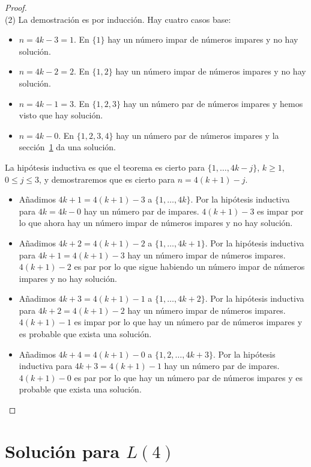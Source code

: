 \begin{proof}
\mbox{}\\
(2)
La demostración es por inducción.
Hay cuatro casos base:
\begin{itemize}
\item $n=4k-3=1$. En $\{1\}$ hay un número impar de números impares y no hay solución.
\item $n=4k-2=2$. En $\{1,2\}$ hay un número impar de números impares y no hay solución.
\item $n=4k-1=3$. En $\{1,2,3\}$ hay un número par de números impares y hemos visto que hay solución.
\item $n=4k-0$. En $\{1,2,3,4\}$ hay un número par de números impares y la sección~\ref{s.langford-four} da una solución.
\end{itemize}

La hipótesis inductiva es que el teorema es cierto para $\{1,\ldots,4k-j\}$, $k\ge 1$, $0\leq j\leq 3$, y demostraremos que es cierto para $n=4(k+1)-j$.

\begin{itemize}
\item Añadimos $4k+1=4(k+1)-3$ a $\{1,\ldots,4k\}$. Por la hipótesis inductiva para $4k=4k-0$ hay un número par de impares. $4(k+1)-3$ es impar por lo que ahora hay un número impar de números impares y no hay solución.
\item Añadimos $4k+2=4(k+1)-2$ a $\{1,\ldots,4k+1\}$. Por la hipótesis inductiva para $4k+1=4(k+1)-3$ hay un número impar de números impares. $4(k+1)-2$ es par por lo que sigue habiendo un número impar de números impares y no hay solución.
\item Añadimos $4k+3=4(k+1)-1$ a $\{1,\ldots,4k+2\}$. Por la hipótesis inductiva para $4k+2=4(k+1)-2$ hay un número impar de números impares. $4(k+1)-1$ es impar por lo que hay un número par de números impares y es probable que exista una solución.
\item Añadimos $4k+4=4(k+1)-0$ a $\{1,2,\ldots,4k+3\}$. Por la hipótesis inductiva para $4k+3=4(k+1)-1$ hay un número par de impares. $4(k+1)-0$ es par por lo que hay un número par de números impares y es probable que exista una solución.
\end{itemize}
\end{proof}


\section{Solución para $L(4)$}\label{s.langford-four}

